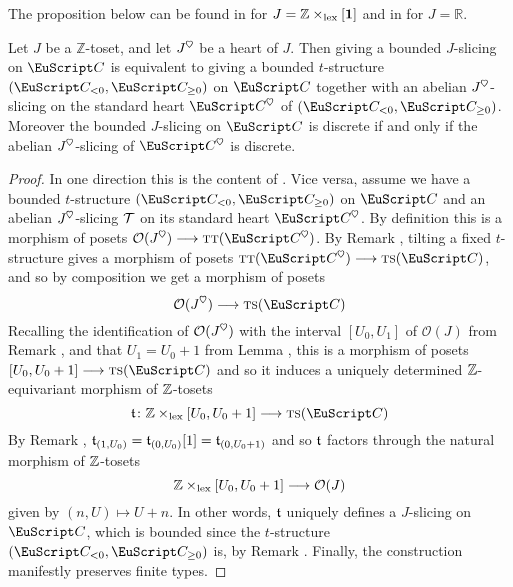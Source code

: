 The proposition below can be found in \cite{Beligiannisreiten} for $J=\mathbb{Z} \times_{\rm{lex}} [\mathbf{1}]$ and in \cite{Brid} for $J=\mathbb{R}$. 
\begin{proposition}\label{converse.if.finite}
Let $J$ be a $\mathbb{Z}$-toset, and let $J^\heart$ be a heart of $J$. Then giving a bounded $J$-slicing on $\C$ is equivalent to giving a bounded $t$-structure $(\C_{< 0},\C_{\ge 0})$ on $\C$ together with an abelian $J^\heart$-slicing on the standard heart $\C^\heart$ of $(\C_{< 0},\C_{\ge 0})$. Moreover the bounded $J$-slicing on $\C$ is discrete if and only if the abelian $J^\heart$-slicing of $\C^\heart$ is discrete.
\end{proposition}
\begin{proof}
In one direction this is the content of \aprop{}. Vice versa, assume we have a bounded $t$-structure $(\C_{< 0},\C_{\ge 0})$ on $\C$ and an abelian $J^\heart$-slicing $\mathcal{T}$ on its standard heart $\C^\heart$. By definition this is a morphism of posets $\mathcal{O}(J^\heart)\to \tot(\C^\heart)$. By Remark , tilting a fixed $t$-structure gives a morphism of posets $\tot(\C^\heart)\to \ts(\C)$, and so by composition we get a morphism of posets 
\[
\mathcal{O}(J^\heart)\to\ts(\C)
\]
Recalling the identification of $\mathcal{O}(J^\heart)$ with the interval $[U_0,U_1]$ of $\mathcal{O}(J)$ from Remark , and that $U_1=U_0+1$ from Lemma , this is a morphism of posets $[U_0,U_0+1]\to \ts(\C)$ and so it induces a uniquely determined $\mathbb{Z}$-equivariant morphism of $\mathbb{Z}$-tosets
\[
\tee\colon \Z\times_{\mathrm{lex}}[U_0,U_0+1]\to \ts(\C)
\]
By Remark , $\mathfrak{t}_{(1,U_0)}=\mathfrak{t}_{(0,U_0)}[1]=\mathfrak{t}_{(0,U_0+1)}$ and so $\mathfrak{t}$ factors through the natural morphism of $\mathbb{Z}$-tosets 
\[
\mathbb{Z}\times_{\mathrm{lex}}[U_0,U_0+1]\longrightarrow \mathcal{O}(J)
\]
given by $(n,U)\mapsto U+n$. In other words, $\mathfrak{t}$ uniquely defines a $J$-slicing on $\C$, 
which is bounded since the $t$-structure $(\C_{< 0},\C_{\ge 0})$ is, by Remark . Finally, the construction manifestly preserves finite types.
\end{proof}